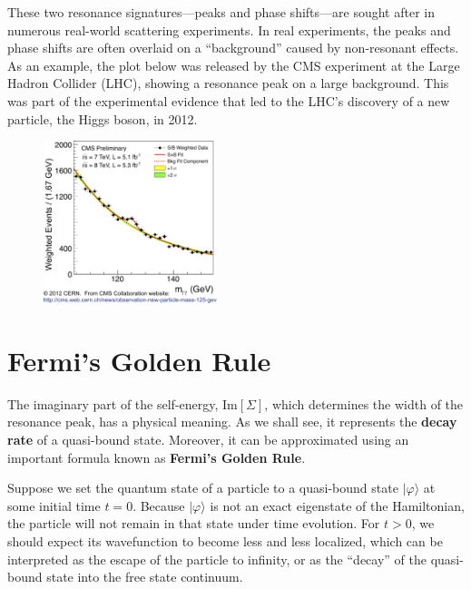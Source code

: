 \documentclass[pra,12pt]{revtex4}
\begin{document}
These two resonance signatures---peaks and phase shifts---are sought
after in numerous real-world scattering experiments.  In real
experiments, the peaks and phase shifts are often overlaid on a
``background'' caused by non-resonant effects.  As an example, the
plot below was released by the CMS experiment at the Large Hadron
Collider (LHC), showing a resonance peak on a large background.  This
was part of the experimental evidence that led to the LHC's discovery
of a new particle, the Higgs boson, in 2012.

\begin{figure}[h]
  \centering\includegraphics[width=0.45\textwidth]{higgs}
\end{figure}

\section{Fermi's Golden Rule}

The imaginary part of the self-energy, $\mathrm{Im}[\Sigma]$, which
determines the width of the resonance peak, has a physical meaning.
As we shall see, it represents the \textbf{decay rate} of a
quasi-bound state.  Moreover, it can be approximated using an
important formula known as \textbf{Fermi's Golden Rule}.

Suppose we set the quantum state of a particle to a quasi-bound state
$|\varphi\rangle$ at some initial time $t = 0$.  Because
$|\varphi\rangle$ is not an exact eigenstate of the Hamiltonian, the
particle will not remain in that state under time evolution.  For $t >
0$, we should expect its wavefunction to become less and less
localized, which can be interpreted as the escape of the particle to
infinity, or as the ``decay'' of the quasi-bound state into the free
state continuum.
\end{document}
